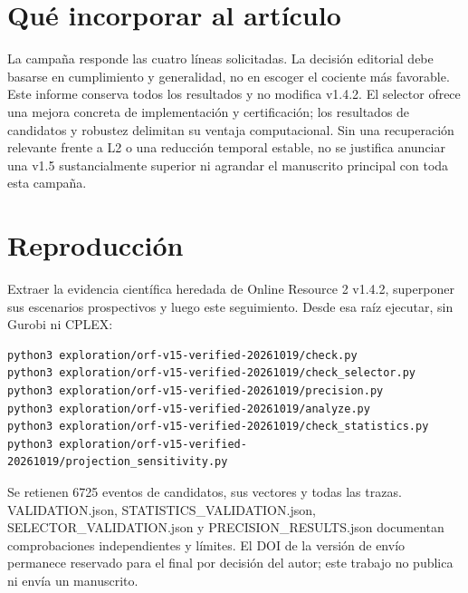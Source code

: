 \documentclass[a4paper,10pt]{article}
\begin{document}
\section*{Qué incorporar al artículo}

La campaña responde las cuatro líneas solicitadas. La decisión editorial
debe basarse en cumplimiento y generalidad, no en escoger el cociente más
favorable. Este informe conserva todos los resultados y no modifica v1.4.2.
El selector ofrece una mejora concreta de implementación y certificación;
los resultados de candidatos y robustez delimitan su ventaja computacional.
Sin una recuperación relevante frente a L2 o una reducción temporal estable,
no se justifica anunciar una v1.5 sustancialmente superior ni agrandar el
manuscrito principal con toda esta campaña.

\section*{Reproducción}

Extraer la evidencia científica heredada de Online Resource 2 v1.4.2,
superponer sus escenarios prospectivos y luego este seguimiento. Desde
esa raíz ejecutar, sin Gurobi ni CPLEX:

\begin{verbatim}
python3 exploration/orf-v15-verified-20261019/check.py
python3 exploration/orf-v15-verified-20261019/check_selector.py
python3 exploration/orf-v15-verified-20261019/precision.py
python3 exploration/orf-v15-verified-20261019/analyze.py
python3 exploration/orf-v15-verified-20261019/check_statistics.py
python3 exploration/orf-v15-verified-20261019/projection_sensitivity.py
\end{verbatim}

Se retienen 6725 eventos de candidatos, sus vectores y todas las trazas.
VALIDATION.json, STATISTICS\_VALIDATION.json, SELECTOR\_VALIDATION.json y
PRECISION\_RESULTS.json documentan comprobaciones independientes y límites.
El DOI de la versión de envío permanece reservado para el final por
decisión del autor; este trabajo no publica ni envía un manuscrito.
\end{document}
